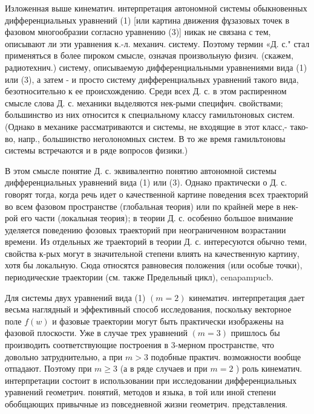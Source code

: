\documentclass[10pt]{article}
\begin{document}
Изложенная выше кинематич. интерпретация автономной системы обыкновенных дифференциальных уравнений (1) [или картина движения фұзазовых точек в фазовом многообразии согласно уравнению (3)] никак не связана с тем, описывают ли эти уравнения к.-л. механич. систему. Поэтому термин «Д. с." стал применяться в более пироком смысле, означая произвольную физич. (скажем, радиотехнич.) систему, описываемую дифференциальными уравнениями вида (1) или (3), а затем - и просто систему дифференциальных уравнений такого вида, безотносительно к ее происхождению. Среди всех Д. с. в этом распиренном смысле слова Д. с. механики выделяются нек-рыми специфич. свойствами; большинство из них относится к специальному классу гамильтоновых систем. (Однако в механике рассматриваются и системы, не входящие в этот класс,- тако- во, напр., большинство неголономных систем. В то же время гамильтоновы системы встречаются и в ряде вопросов физики.)



В этом смысле понятие Д. с. эквивалентно понятию автономной системы дифференциальных уравнений вида (1) или (3). Однако практически о Д. с. говорят тогда, когда речь идет о качественной картине поведения всех траекторий во всем фазовом пространстве (глобальная теория) или по крайней мере в нек-рой его части (локальная теория); в теории Д. с. особенно большое внимание уделяется поведению фозовых траекторий при неограниченном возрастании времени. Из отдельных же траекторий в теории Д. с. интересуются обычно теми, свойства к-рых могут в значительной степени влиять на качественную картину, хотя бы локальную. Сюда относятся равновесия положения (или особые точки), периодические траектории (см. также Предельный цикл), cenapampucb.



Для системы двух уравнений вида (1) $(m=2)$ кинематич. интерпретация дает весьма наглядный и эффективный способ исследования, поскольку векторное поле $f(w)$ и фазовые траектории могут быть практически изображены на фазовой плоскости. Уже в случае трех уравнений $(m=3)$ пришлось бы производить соответствующие построения в 3-мерном пространстве, что довольно затруднительно, а при $m>3$ подобные практич. возможности вообще отпадают. Поэтому при $m \geqslant 3$ (а в ряде случаев и при $m=2$ ) роль кинематич. интерпретации состоит в использовании при исследовании дифференциальных уравнений геометрич. понятий, методов и языка, в той или иной степени обобщающих привычные из повседневной жизни геометрич. представления.
\end{document}
